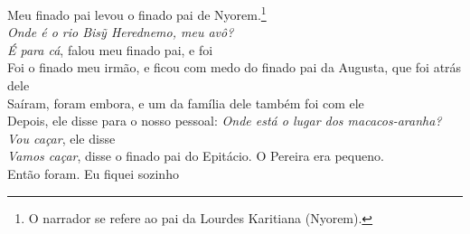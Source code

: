 \bigskip

\begin{linenumbers}\begingroup\raggedright
 
\noindent   Meu finado pai levou o finado pai de Nyorem.\footnote{O narrador se refere ao pai da Lourdes Karitiana (Nyorem).}\\
  \emph{Onde é o rio Bisỹ Herednemo, meu avô?}\\
  \emph{É para cá}, falou meu finado pai, e foi\\
  Foi o finado meu irmão, e ficou com medo do finado pai da Augusta, que foi atrás dele\\
  Saíram, foram embora, e um da família dele também foi com ele\\
  Depois, ele disse para o nosso pessoal: \emph{Onde está o lugar dos macacos-aranha?}\\
  \emph{Vou caçar}, ele disse\\
  \emph{Vamos caçar}, disse o finado pai do Epitácio. O Pereira era pequeno.\\
  Então foram. Eu fiquei sozinho
 
\end{linenumbers}\endgroup

\bigskip

